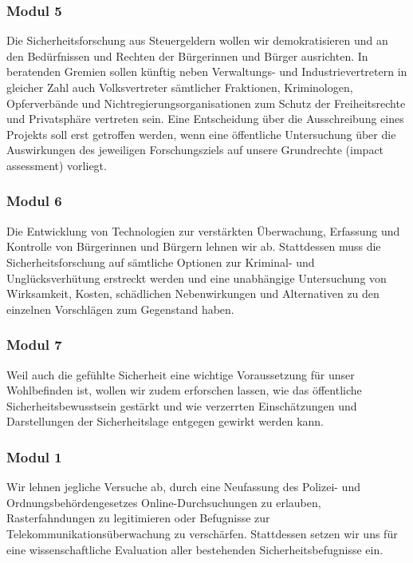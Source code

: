 \subsubsection{Modul 5}
\abstimmung
Die Sicherheitsforschung aus Steuergeldern wollen wir demokratisieren und an den Bedürfnissen und Rechten der Bürgerinnen und Bürger ausrichten. In beratenden Gremien sollen künftig neben Verwaltungs- und Industrievertretern in gleicher Zahl auch Volksvertreter sämtlicher Fraktionen, Kriminologen, Opferverbände und Nichtregierungsorganisationen zum Schutz der Freiheitsrechte und Privatsphäre vertreten sein. Eine Entscheidung über die Ausschreibung eines Projekts soll erst getroffen werden, wenn eine öffentliche Untersuchung über die Auswirkungen des jeweiligen Forschungsziels auf unsere Grundrechte (impact assessment) vorliegt.

\subsubsection{Modul 6}
\abstimmung
Die Entwicklung von Technologien zur verstärkten Überwachung, Erfassung und Kontrolle von Bürgerinnen und Bürgern lehnen wir ab. Stattdessen muss die Sicherheitsforschung auf sämtliche Optionen zur Kriminal- und Unglücksverhütung erstreckt werden und eine unabhängige Untersuchung von Wirksamkeit, Kosten, schädlichen Nebenwirkungen und Alternativen zu den einzelnen Vorschlägen zum Gegenstand haben.

\subsubsection{Modul 7}
\abstimmung
Weil auch die gefühlte Sicherheit eine wichtige Voraussetzung für unser Wohlbefinden ist, wollen wir zudem erforschen lassen, wie das öffentliche Sicherheitsbewusstsein gestärkt und wie verzerrten Einschätzungen und Darstellungen der Sicherheitslage entgegen gewirkt werden kann.
 
\subsubsection{Modul 1}
\abstimmung
Wir lehnen jegliche Versuche ab, durch eine Neufassung des Polizei- und Ordnungsbehördengesetzes Online-Durchsuchungen zu erlauben, Rasterfahndungen zu legitimieren oder Befugnisse zur Telekommunikationsüberwachung zu verschärfen. Stattdessen setzen wir uns für eine wissenschaftliche Evaluation aller bestehenden Sicherheitsbefugnisse ein.
 
